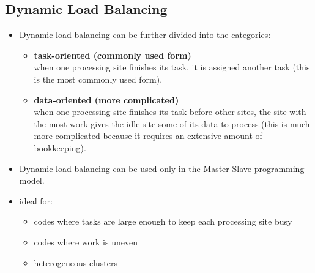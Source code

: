 \documentclass[12pt, a4paper]{book}
\begin{document}
\subsection{Dynamic Load Balancing}
\begin{itemize}
    \item Dynamic load balancing can be further divided into the categories:
          \begin{itemize}
              \item \textbf{task-oriented (commonly used form)} \\
                    when one processing site finishes its task, it is assigned another task (this is the most commonly used form).
              \item \textbf{data-oriented (more complicated)}\\
                    when one processing site finishes its task before other sites, the site with the most work gives the idle site some of its data to process (this is much more complicated because it requires an extensive amount of bookkeeping).
          \end{itemize}
    \item Dynamic load balancing can be used only in the Master-Slave programming model.
    \item ideal for: \begin{itemize}
              \item codes where tasks are large enough to keep each processing site busy
              \item codes where work is uneven
              \item heterogeneous clusters
          \end{itemize}
\end{itemize}


\end{document}
